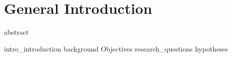 \chapter{General Introduction}
\label{chapter:introduction}
\glsresetall
{abstract}



\clearpage
\glsresetall
{intro_introduction}
{background}
{Objectives}
{research_questions}
{hypotheses}

